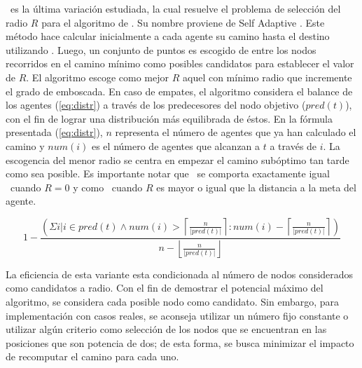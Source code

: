 \sarambush\ es la \'ultima variaci\'on estudiada, la cual
resuelve el problema de selecci\'on del radio $R$ para el
algoritmo de \rambush. Su nombre proviene de Self Adaptive
\rambush. Este m\'etodo hace calcular inicialmente a cada
agente su camino hasta el destino utilizando \astar. Luego,
un conjunto de puntos es escogido de entre los nodos recorridos
en el camino m\'inimo como posibles candidatos para establecer
el valor de $R$. El algoritmo escoge como mejor $R$ aquel
con m\'inimo radio que incremente el grado de emboscada. En
caso de empates, el algoritmo considera el balance de los
agentes (\ref{eq:distr}) a trav\'es de los predecesores del
nodo objetivo ($pred(t)$), con el fin de lograr una distribuci\'on m\'as
equilibrada de \'estos. 
En la f\'ormula presentada (\ref{eq:distr}), $n$ representa
el n\'umero de agentes que ya han calculado el camino y
$num(i)$ es el n\'umero de agentes que alcanzan a $t$ a trav\'es
de $i$.
La escogencia del menor radio se
centra en empezar el camino sub\'optimo tan tarde como sea
posible. Es importante notar que \rambush\ se comporta exactamente
igual \astar\ cuando $R=0$ y como \ambush\ cuando $R$ es mayor
o igual que la distancia a la meta del agente.

\begin{small}
\begin{equation}
1-\dfrac{\left(\Sigma i |  i \in pred(t)
  						\wedge num(i) > 
  							\left\lceil \frac{n}{|pred(t)|} \right\rceil 
  					:  num(i) - 
  						\left\lceil \frac{n}{|pred(t)|} \right\rceil\right)}
  						{n-\left\lfloor \frac{n}{|pred(t)|} \right\rfloor}
\label{eq:distr}
\end{equation}
\end{small}

La eficiencia de esta variante esta condicionada al n\'umero de
nodos considerados como candidatos a radio. Con el fin de demostrar
el potencial m\'aximo del algoritmo, se con\-si\-de\-ra cada posible nodo
como candidato. Sin embargo, para implementaci\'on con casos reales, 
se aconseja utilizar un n\'umero fijo constante o utilizar alg\'un
criterio como selecci\'on de los nodos que se encuentran en las
posiciones que son potencia de dos; de esta forma, se busca minimizar
el impacto de recomputar el camino para cada uno.
